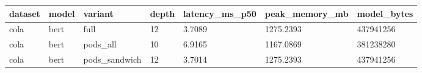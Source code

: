 \begin{tabular}{lllllll}
\hline
dataset & model & variant & depth & latency\_ms\_p50 & peak\_memory\_mb & model\_bytes \\
\hline
cola & bert & full & 12 & 3.7089 & 1275.2393 & 437941256 \\
cola & bert & pods\_all & 10 & 6.9165 & 1167.0869 & 381238280 \\
cola & bert & pods\_sandwich & 12 & 3.7014 & 1275.2393 & 437941256 \\
\hline
\end{tabular}
